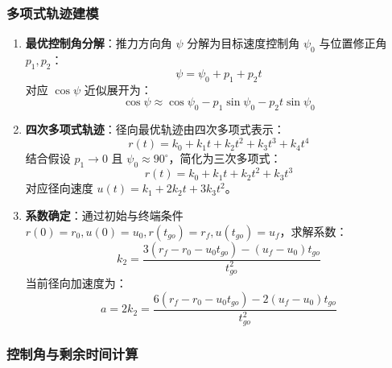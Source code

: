 \documentclass[12pt,a4paper]{article}
\begin{document}
\subsubsection{多项式轨迹建模}
\begin{enumerate}
    \item \textbf{最优控制角分解}：推力方向角 \(\psi\) 分解为目标速度控制角 \(\psi_0\) 与位置修正角 \(p_1, p_2\)：
    \begin{equation}
        \psi = \psi_0 + p_1 + p_2 t
        \label{eq:control_angle}
    \end{equation}
    对应 \(\cos \psi\) 近似展开为：
    \begin{equation}
        \cos \psi \approx \cos \psi_0 - p_1 \sin \psi_0 - p_2 t \sin \psi_0
        \label{eq:cos_approx}
    \end{equation}

    \item \textbf{四次多项式轨迹}：径向最优轨迹由四次多项式表示：
    \begin{equation}
        r(t) = k_0 + k_1 t + k_2 t^2 + k_3 t^3 + k_4 t^4
        \label{eq:quartic_traj}
    \end{equation}
    结合假设 \(p_1 \to 0\) 且 \(\psi_0 \approx 90^\circ\)，简化为三次多项式：
    \begin{equation}
        r(t) = k_0 + k_1 t + k_2 t^2 + k_3 t^3
        \label{eq:cubic_traj}
    \end{equation}
    对应径向速度 \(u(t) = k_1 + 2k_2 t + 3k_3 t^2\)。

    \item \textbf{系数确定}：通过初始与终端条件 \(r(0)=r_0, u(0)=u_0, r(t_{go})=r_f, u(t_{go})=u_f\)，求解系数：
    \begin{equation}
        k_2 = \frac{3(r_f - r_0 - u_0 t_{go}) - (u_f - u_0)t_{go}}{t_{go}^2}
        \label{eq:coeff_k2}
    \end{equation}
    当前径向加速度为：
    \begin{equation}
        a = 2k_2 = \frac{6(r_f - r_0 - u_0 t_{go}) - 2(u_f - u_0)t_{go}}{t_{go}^2}
        \label{eq:radial_accel}
    \end{equation}
\end{enumerate}

\subsubsection{控制角与剩余时间计算}
\end{document}
